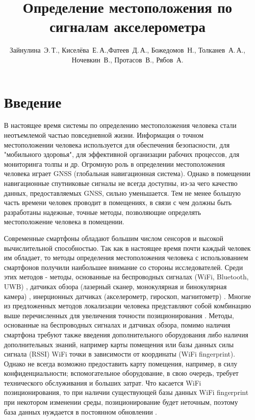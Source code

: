 \documentclass[12pt,twoside]{article}
\title
    [Определение местоположения по сигналам акселерометра] 
    {Определение местоположения по сигналам акселерометра}
\author
    [Зайнулина~Э.\,Т.] %
    {Зайнулина~Э.\,Т., Киселёва~Е.\,А.,Фатеев~Д.\,А.,
    Божедомов~Н., Толканев~А.\,А., Ночевкин~В.,
    Протасов~В., Рябов~А.} %
\begin{document}
\maketitle

\section{Введение}
В настоящее время системы по определению местоположения человека стали неотъемлемой частью повседневной жизни. Информация о точном местоположении человека используется для обеспечения безопасности, для "мобильного здоровья", для эффективной организации рабочих процессов, для мониторинга толпы и др. Огромную роль в определении местоположения человека играет GNSS (глобальная навигационная система). Однако в помещении навигационные спутниковые сигналы не всегда доступны, из-за чего качество данных, предоставляемых GNSS, сильно уменьшается. Тем не менее большую часть времени человек проводит в помещениях, в связи с чем должны быть разработаны надежные, точные методы, позволяющие определять местоположение человека в помещении.

Современные смартфоны обладают большим числом сенсоров и высокой вычислительной способностью. Так как в настоящее время почти каждый человек им обладает, то методы определения местоположения человека с использованием смартфонов получили наибольшее внимание со стороны исследователей. Среди этих методов - методы, основанные на беспроводных сигналах (WiFi, Bluetooth, UWB) \cite{journals/puc/VeraOA11} \cite{journals/puc/KimJP13}, датчиках обзора (лазерный сканер, монокулярная и бинокулярная камера) \cite{journals/puc/BrunsB09}, инерционных датчиках (акселерометр, гироскоп, магнитометр) \cite{journals/puc/ParkSC13} \cite{journals/puc/HardeggerRT15} \cite{journals/sensors/WangLYJG18} \cite{6987239}. Многие из предложенных методов локализации человека представляют собой комбинацию выше перечисленных для увеличения точности позиционирования \cite{journals/ejasp/EvennouM06} \cite{6834746} \cite{7021969}. Методы, основанные на беспроводных сигналах и датчиках обзора, помимо наличия смартфона требуют также введения дополнительного оборудования либо наличия дополнительных знаний, например карты помещения или базы данных силы сигнала (RSSI) WiFi точки в зависимости от координаты (WiFi fingerprint). Однако не всегда возможно предоставить карту помещения, например, в силу конфиденциальности; вспомогательное оборудование, в свою очередь, требует технического обслуживания и больших затрат. Что касается WiFi позиционирования, то при наличии существующей базы данных WiFi fingerprint при некотором изменении среды, позиционирование будет неточным, поэтому база данных нуждается в постоянном обновлении \cite{journals/sensors/Torres-Sospedra17a}.
\end{document}
